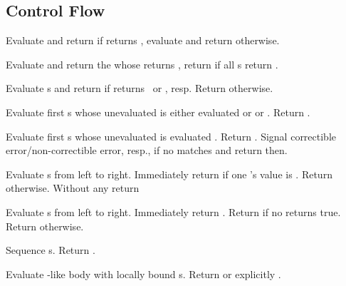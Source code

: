 \subsection{Control Flow}
\begin{LIST}{1cm}

   Evaluate and return
   if  returns \T, evaluate and return
   otherwise.

  Evaluate and return the
   whose  returns \T, return
  \retval{\NIL} if all s return \NIL.

  Evaluate s and return  if
   returns \T\ or \NIL, resp. Return \retval{\NIL} otherwise.

  Evaluate first s whose unevaluated  is either  evaluated
   or  or . Return .

  Evaluate first s whose unevaluated  is  evaluated
  . Return . Signal correctible error/non-correctible error,
  resp., if no  matches and return \retval{\NIL} then.

   Evaluate s from left to
  right. Immediately return \retval{\NIL} if one 's value is \NIL. Return
   otherwise. Without any 
  return \retval{\NIL}

   Evaluate s from left to
  right. Immediately return . Return \retval{\NIL} if no  returns true.
  Return  otherwise.

   Sequence s. Return
  .

  Evaluate -like body with locally bound
  s. Return \retval{\NIL} or explicitly .
  

\end{LIST}
